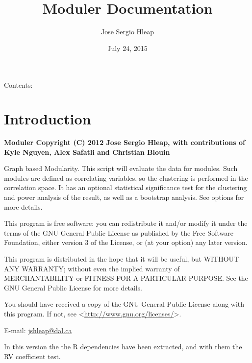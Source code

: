 \documentclass[letterpaper,10pt,english]{sphinxmanual}
\title{Moduler Documentation}
\date{July 24, 2015}
\author{Jose Sergio Hleap}
\begin{document}
\maketitle
\tableofcontents
{}\label{index::doc}


Contents:


\chapter{Introduction}
\label{Intro:introduction}\label{Intro::doc}\label{Intro:welcome-to-moduler-s-documentation}\label{Intro:module-Moduler}
\textbf{Moduler Copyright (C) 2012  Jose Sergio Hleap, with contributions of Kyle Nguyen, Alex Safatli and Christian Blouin}

Graph based Modularity.
This script will evaluate the data for modules. Such modules are defined as correlating variables, so the clustering 
is performed in the correlation space. It has an optional statistical significance test for the clustering and power
analysis of the result, as well as a bootstrap analysis. See options for more details.

This program is free software: you can redistribute it and/or modify
it under the terms of the GNU General Public License as published by
the Free Software Foundation, either version 3 of the License, or
(at your option) any later version.

This program is distributed in the hope that it will be useful,
but WITHOUT ANY WARRANTY; without even the implied warranty of
MERCHANTABILITY or FITNESS FOR A PARTICULAR PURPOSE.  See the
GNU General Public License for more details.

You should have received a copy of the GNU General Public License
along with this program.  If not, see \textless{}\href{http://www.gnu.org/licenses/}{http://www.gnu.org/licenses/}\textgreater{}.

E-mail: \href{mailto:jshleap@dal.ca}{jshleap@dal.ca}

In this version the the R dependencies have been extracted, and with them the RV coefficient test.
\end{document}
